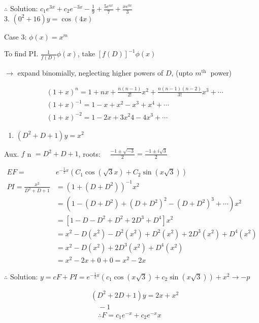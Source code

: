 \documentclass[12pt, a4paper]{article}
\begin{document}
$\therefore$ Solution: $c_{1} e^{3 x}+c_{2} e^{-3 x}-\frac{1}{9}+\frac{5 e^{4 x}}{7}+\frac{x e^{3 x}}{3}$\\
3. $\left(0^{2}+16\right) y=\cos (4 x)$

Case 3: $\phi(x)=x^{m}$

To find PI. $\frac{1}{f(D)} \phi(x)$, take $[f(D)]^{-1} \phi(x)$

$\rightarrow$ expand binomially, neglecting higher powers of $D$, (upto $m^{\text {th }}$ power)

$$
\begin{aligned}
& (1+x)^{n}=1+n x+\frac{n(n-1)}{2!} x^{2}+\frac{n(n-1)(n-2)}{3!} x^{3}+\cdots \\
& (1+x)^{-1}=1-x+x^{2}-x^{3}+x^{4}+\cdots \\
& (1+x)^{-2}=1-2 x+3 x^{2} 4-4 x^{3}+\cdots
\end{aligned}
$$

\begin{enumerate}
  \item $\left(D^{2}+D+1\right) y=x^{2}$
\end{enumerate}

Aux. $f$ n $=D^{2}+D+1$, roots: $\quad \frac{-1 \pm \sqrt{-3}}{2}=\frac{-1 \pm i \sqrt{3}}{2}$

$$
\begin{aligned}
E F= & e^{-\frac{1}{2} x}\left(C_{1} \cos (\sqrt{3} x)+C_{2} \sin (x \sqrt{3})\right) \\
P I=\frac{x^{2}}{D^{2}+D+1} & =\left(1+\left(D+D^{2}\right)\right)^{-1} x^{2} \\
& =\left(1-\left(D+D^{2}\right)+\left(D+D^{2}\right)^{2}-\left(D+D^{2}\right)^{3}+\cdots\right) x^{2} \\
& =\left[1-D-D^{2}+D^{2}+2 D^{3}+D^{4}\right] x^{2} \\
& =x^{2}-D\left(x^{2}\right)-D^{2}\left(x^{2}\right)+D^{2}\left(x^{2}\right)+2 D^{3}\left(x^{2}\right)+D^{4}\left(x^{2}\right) \\
& =x^{2}-D\left(x^{2}\right)+2 D^{3}\left(x^{2}\right)+D^{4}\left(x^{2}\right) \\
& =x^{2}-2 x+0+0=x^{2}-2 x
\end{aligned}
$$

$\therefore$ Solution: $y=c F+P I=e^{-\frac{1}{2} x}\left(c_{1} \cos (x \sqrt{3})+c_{2} \sin (x \sqrt{3})\right)+x^{2} \rightarrow-p$

$$
\begin{aligned}
& \left(D^{2}+2 D+1\right) y=2 x+x^{2} \\
& \quad-1 \\
& \quad \therefore F=c_{1} e^{-x}+c_{2} e^{-x} x
\end{aligned}
$$
\end{document}
